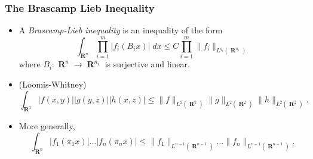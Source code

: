 \documentclass[usenames,dvipsnames,12pt]{beamer}
\DeclareMathOperator{\RR}{\mathbf{R}}
\begin{document}
\begin{frame}

\frametitle{The Brascamp Lieb Inequality}

\begin{itemize}
    \item A \emph{Brascamp-Lieb inequality} is an inequality of the form
    \[ \int_{\RR^n} \prod_{i = 1}^m |f_i(B_i x)|\; dx \leq C \prod_{i = 1}^m \| f_i \|_{L^{q_i}(\RR^{n_i})} \]
    where $B_i: \RR^n \to \RR^{n_i}$ is surjective and linear.


    \item (Loomis-Whitney)
    \[ \int_{\RR^3} |f(x,y)| |g(y,z)| |h(x,z)| \leq \| f \|_{L^2(\RR^2)} \| g \|_{L^2(\RR^2)} \| h \|_{L^2(\RR^2)}. \]

    \pause
    \item
    More generally,
    \[ \int_{\RR^n} |f_1(\pi_1 x)| \dots |f_n(\pi_n x)| \leq \| f_1 \|_{L^{n-1}(\RR^{n-1})} \dots \| f_n \|_{L^{n-1}(\RR^{n-1})}. \]

\end{itemize}

\end{frame}
\end{document}
